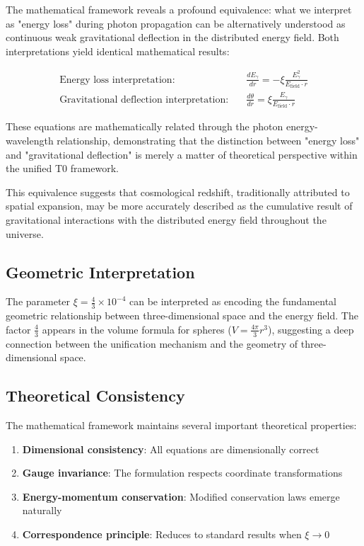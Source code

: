 \documentclass[12pt,a4paper]{article}
\newcommand{\efield}{E_{\text{field}}}
\theoremstyle{definition}
\begin{document}
	The mathematical framework reveals a profound equivalence: what we interpret as "energy loss" during photon propagation can be alternatively understood as continuous weak gravitational deflection in the distributed energy field. Both interpretations yield identical mathematical results:
	
	\begin{align}
		\text{Energy loss interpretation:} \quad &\frac{dE_\gamma}{dr} = -\xi \frac{E_\gamma^2}{\efield \cdot r} \\
		\text{Gravitational deflection interpretation:} \quad &\frac{d\theta}{dr} = \xi \frac{E_\gamma}{\efield \cdot r}
	\end{align}
	
	These equations are mathematically related through the photon energy-wavelength relationship, demonstrating that the distinction between "energy loss" and "gravitational deflection" is merely a matter of theoretical perspective within the unified T0 framework.
	
	This equivalence suggests that cosmological redshift, traditionally attributed to spatial expansion, may be more accurately described as the cumulative result of gravitational interactions with the distributed energy field throughout the universe.
	
	\subsection{Geometric Interpretation}
	
	The parameter $\xi = \frac{4}{3} \times 10^{-4}$ can be interpreted as encoding the fundamental geometric relationship between three-dimensional space and the energy field. The factor $\frac{4}{3}$ appears in the volume formula for spheres ($V = \frac{4\pi}{3}r^3$), suggesting a deep connection between the unification mechanism and the geometry of three-dimensional space.
	
	\subsection{Theoretical Consistency}
	
	The mathematical framework maintains several important theoretical properties:
	
	\begin{enumerate}
		\item \textbf{Dimensional consistency}: All equations are dimensionally correct
		\item \textbf{Gauge invariance}: The formulation respects coordinate transformations
		\item \textbf{Energy-momentum conservation}: Modified conservation laws emerge naturally
		\item \textbf{Correspondence principle}: Reduces to standard results when $\xi \rightarrow 0$
	\end{enumerate}
	
\end{document}
